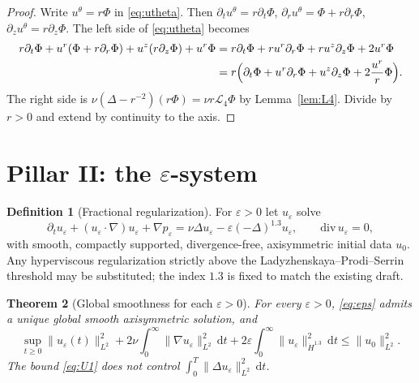 \documentclass[11pt]{article}
\newtheorem{theorem}{Theorem}[section]
\theoremstyle{definition}
\newtheorem{definition}[theorem]{Definition}
\newcommand{\eps}{\varepsilon}
\newcommand{\dd}{\mathrm{d}}
\newcommand{\ur}{u^{r}}
\newcommand{\uz}{u^{z}}
\newcommand{\ut}{u^{\theta}}
\newcommand{\Ph}{\Phi}
\newcommand{\Lfour}{\mathcal{L}_{4}}
\newcommand{\Hdot}{\dot{H}}
\newcommand{\norm}[2]{\|#1\|_{#2}}
\begin{document}
\begin{proof}
Write \(\ut=r\Ph\) in \eqref{eq:utheta}. Then
\(\partial_t\ut=r\partial_t\Ph\),
\(\partial_r\ut=\Ph+r\partial_r\Ph\),
\(\partial_z\ut=r\partial_z\Ph\).
The left side of \eqref{eq:utheta} becomes
\begin{align*}
r\partial_t\Ph+\ur(\Ph+r\partial_r\Ph)+\uz(r\partial_z\Ph)+\ur\Ph
&=r\partial_t\Ph+r\ur\partial_r\Ph+r\uz\partial_z\Ph+2\ur\Ph\\
&=r\Bigl(\partial_t\Ph+\ur\partial_r\Ph+\uz\partial_z\Ph+2\frac{\ur}{r}\Ph\Bigr).
\end{align*}
The right side is \(\nu(\Delta-r^{-2})(r\Ph)=\nu r\Lfour\Ph\) by
Lemma~\ref{lem:L4}. Divide by \(r>0\) and extend by continuity to the
axis.
\end{proof}

\section{Pillar II: the \(\eps\)-system}
\label{sec:eps}

\begin{definition}[Fractional regularization]
\label{def:eps}
For \(\eps>0\) let \(u_\eps\) solve
\begin{equation}
  \label{eq:eps}
  \partial_t u_\eps+(u_\eps\cdot\nabla)u_\eps+\nabla p_\eps
  =\nu\Delta u_\eps-\eps(-\Delta)^{1.3}u_\eps,
  \qquad \mathrm{div}\,u_\eps=0,
\end{equation}
with smooth, compactly supported, divergence-free, axisymmetric
initial data \(u_0\). Any hyperviscous regularization strictly above
the Ladyzhenskaya--Prodi--Serrin threshold may be substituted;
the index \(1.3\) is fixed to match the existing draft.
\end{definition}

\begin{theorem}[Global smoothness for each \(\eps>0\)]
\label{thm:eps}
For every \(\eps>0\), \eqref{eq:eps} admits a unique global smooth
axisymmetric solution, and
\begin{equation}
  \label{eq:U1}
  \sup_{t\ge 0}\norm{u_\eps(t)}{L^2}^2
  +2\nu\int_0^\infty\norm{\nabla u_\eps}{L^2}^2\,\dd t
  +2\eps\int_0^\infty\norm{u_\eps}{\Hdot^{1.3}}^2\,\dd t
  \le\norm{u_0}{L^2}^2.
\end{equation}
The bound \eqref{eq:U1} does \emph{not} control
\(\int_0^T\norm{\Delta u_\eps}{L^2}^2\,\dd t\).
\end{theorem}
\end{document}
